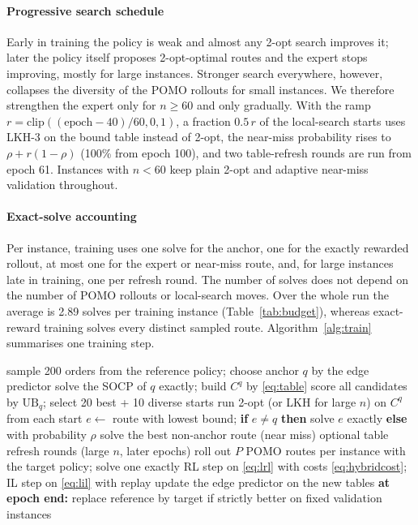 \documentclass[preprint,review,12pt,authoryear]{elsarticle}
\newcommand{\UB}{\mathrm{UB}}
\begin{document}
\paragraph{Progressive search schedule}\label{sec:recipe}
Early in training the policy is weak and almost any 2-opt search improves it; later the policy itself proposes
2-opt-optimal routes and the expert stops improving, mostly for large instances. Stronger search everywhere,
however, collapses the diversity of the POMO rollouts for small instances. We therefore strengthen the expert only
for $n\ge60$ and only gradually. With the ramp $r=\mathrm{clip}((\text{epoch}-40)/60,0,1)$, a fraction $0.5\,r$ of
the local-search starts uses LKH-3 \citep{helsgaun2017lkh3} on the bound table instead of 2-opt, the near-miss
probability rises to $\rho+r(1-\rho)$ (100\% from epoch 100), and two table-refresh rounds are run from epoch 61.
Instances with $n<60$ keep plain 2-opt and adaptive near-miss validation throughout.

\paragraph{Exact-solve accounting} Per instance, training uses one solve for the anchor, one for the exactly
rewarded rollout, at most one for the expert or near-miss route, and, for large instances late in training, one
per refresh round. The number of solves does not depend on the number of POMO rollouts or local-search moves. Over
the whole run the average is 2.89 solves per training instance (Table~\ref{tab:budget}), whereas exact-reward
training solves every distinct sampled route. Algorithm~\ref{alg:train} summarises one training step.

\begin{algorithm}[t]
\caption{Self-improving training (one batch $\mathcal B$)}\label{alg:train}
\begin{algorithmic}[1]
  \State sample 200 orders from the reference policy; choose anchor $q$ by the edge predictor
  \State solve the SOCP of $q$ exactly; build $C^{q}$ by \eqref{eq:table} 
  \State score all candidates by $\UB_q$; select 20 best + 10 diverse starts
  \State run 2-opt (or LKH for large $n$) on $C^q$ from each start 
  \State $e\gets$ route with lowest bound; \textbf{if} $e\ne q$ \textbf{then} solve $e$ exactly 
  \State \textbf{else} with probability $\rho$ solve the best non-anchor route (near miss)
  \State optional table refresh rounds (large $n$, later epochs)
\EndFor
\State roll out $P$ POMO routes per instance with the target policy; solve one exactly 
\State RL step on \eqref{eq:lrl} with costs \eqref{eq:hybridcost}; IL step on \eqref{eq:lil} with replay
\State update the edge predictor on the new tables
\State \textbf{at epoch end:} replace reference by target if strictly better on fixed validation instances
\end{algorithmic}
\end{algorithm}
\end{document}
